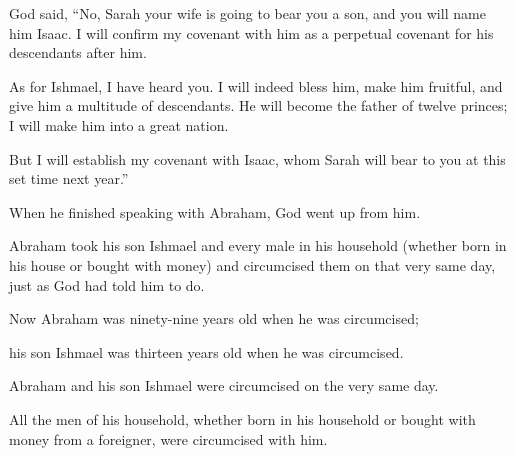 \begin{scripture}
 God said, ``No, Sarah your wife is going to bear you a son, and you will name him Isaac. I will confirm my covenant with him as a perpetual covenant for his descendants after him.
 As for Ishmael, I have heard you. I will indeed bless him, make him fruitful, and give him a multitude of descendants. He will become the father of twelve princes; I will make him into a great nation.
 But I will establish my covenant with Isaac, whom Sarah will bear to you at this set time next year.''
 When he finished speaking with Abraham, God went up from him.
\everypar{}

 Abraham took his son Ishmael and every male in his household (whether born in his house or bought with money) and circumcised them on that very same day, just as God had told him to do.
 Now Abraham was ninety-nine years old when he was circumcised;
 his son Ishmael was thirteen years old when he was circumcised.
 Abraham and his son Ishmael were circumcised on the very same day.
 All the men of his household, whether born in his household or bought with money from a foreigner, were circumcised with him.


\end{scripture}
